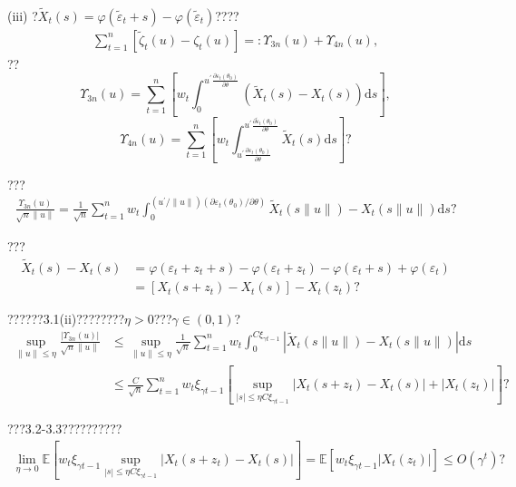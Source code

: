 \documentclass[a4paper,12pt,openany,oneside,utf-8]{ctexbook}
\begin{document}
	\
	
	\noindent (iii) ?$\tilde{X}_t(s)=\varphi(\tilde{\varepsilon}_t+s)-\varphi(\tilde{\varepsilon}_t)$????
	\begin{align}\label{338}
		\sum_{t=1}^{n}\left[\tilde{\zeta}_{t}(u)-\zeta_{t}(u)\right]=: \Upsilon_{3 n}(u)+\Upsilon_{4 n}(u),
	\end{align}
	??
	$$\Upsilon_{3 n}(u)=\sum_{t=1}^{n}\left[w_t\int_0^{u^{\prime}\frac{\partial\varepsilon_t(\theta_0)}{\partial\theta}}\left(\tilde{X}_t(s)-X_t(s)\right)\mathrm{d}s\right],$$
	$$\Upsilon_{4 n}(u)=\sum_{t=1}^{n}\left[w_t\int_{u^{\prime}\frac{\partial\varepsilon_t(\theta_0)}{\partial\theta}}^{u^{\prime}\frac{\partial\tilde{\varepsilon}_t(\theta_0)}{\partial\theta}}\tilde{X}_t(s)\mathrm{d}s\right]\mbox{?}$$
	
	\noindent ???
	\begin{align}
		\frac{\Upsilon_{3 n}(u)}{\sqrt{n}\|u\|}=\frac{1}{\sqrt{n}} \sum_{t=1}^{n} w_{t} \int_{0}^{\left(u^{\prime} /\|u\|\right)\left(\partial \varepsilon_{t}\left(\theta_{0}\right) / \partial \theta\right)} \tilde{X}_{t}(s\|u\|)-X_{t}(s\|u\|)\mathrm{d}s \mbox{?}\nonumber
	\end{align}
	
	\noindent ???
	\begin{align}
		\tilde{X}_{t}(s)-X_{t}(s)&=\varphi(\varepsilon_t+z_t+s)-\varphi(\varepsilon_t+z_t)-\varphi(\varepsilon_t+s)+\varphi(\varepsilon_t)\nonumber\\
		&=\left[X_{t}\left(s+z_{t}\right)-X_{t}(s)\right]-X_{t}\left(z_{t}\right) \mbox{?}\nonumber
	\end{align}
	
	\noindent ??????3.1(ii)????????$\eta>0$???$\gamma\in(0,1)$?
	\begin{align}
		\sup _{\|u\| \leq \eta} \frac{\left|\Upsilon_{3 n}(u)\right|}{\sqrt{n}\|u\|} &\leq \sup _{\|u\| \leq \eta} \frac{1}{\sqrt{n}} \sum_{t=1}^{n} w_{t} \int_{0}^{C \xi_{\gamma t-1}}\left|\tilde{X}_{t}(s\|u\|)-X_{t}(s\|u\|)\right|\mathrm{d}s\nonumber\\
		&\leq \frac{C}{\sqrt{n}} \sum_{t=1}^{n} w_{t} \xi_{\gamma t-1}\left[\sup _{|s| \leq \eta C \xi_{\gamma t-1}}\left|X_{t}\left(s+z_{t}\right)-X_{t}(s)\right|+\left|X_{t}\left(z_{t}\right)\right|\right]\mbox{?}\nonumber
	\end{align}
	
	\noindent ???3.2-3.3??????????
	\begin{align}
		\lim _{\eta \rightarrow 0} \mathbb{E}\left[w_{t} \xi_{\gamma t-1} \sup _{|s| \leq \eta C \xi_{\gamma t-1}}\left|X_{t}\left(s+z_{t}\right)-X_{t}(s)\right|\right]=\mathbb{E}\left[w_{t} \xi_{\gamma t-1}\left|X_{t}\left(z_{t}\right)\right|\right]\leq O\left(\gamma^{t}\right)\mbox{?}\nonumber
	\end{align}
	
\end{document}
